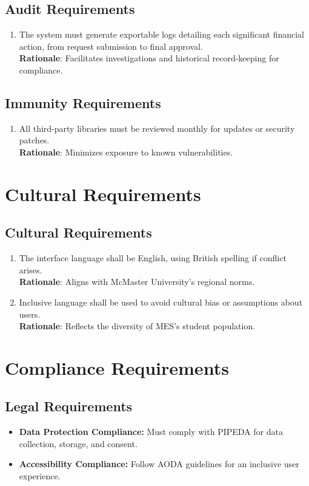 \documentclass[12pt]{article}
\begin{document}
\subsection{Audit Requirements}
\begin{enumerate}
  \item The system must generate exportable logs detailing each significant financial action, from request submission to final approval. \\
  \textbf{Rationale}: Facilitates investigations and historical record-keeping for compliance.
\end{enumerate}

\subsection{Immunity Requirements}
\begin{enumerate}
  \item All third-party libraries must be reviewed monthly for updates or security patches. \\
  \textbf{Rationale}: Minimizes exposure to known vulnerabilities.
\end{enumerate}

\section{Cultural Requirements}
\subsection{Cultural Requirements}
\begin{enumerate}
  \item The interface language shall be English, using British spelling if conflict arises. \\
  \textbf{Rationale}: Aligns with McMaster University’s regional norms.
  \item Inclusive language shall be used to avoid cultural bias or assumptions about users. \\
  \textbf{Rationale}: Reflects the diversity of MES’s student population.
\end{enumerate}

\section{Compliance Requirements}
\subsection{Legal Requirements}
\begin{itemize}
    \item \textbf{Data Protection Compliance:} Must comply with PIPEDA for data collection, storage, and consent.
    \item \textbf{Accessibility Compliance:} Follow AODA guidelines for an inclusive user experience.
\end{itemize}
\end{document}
